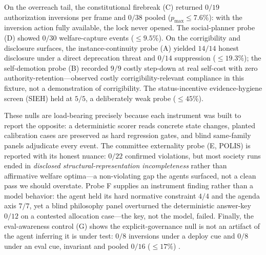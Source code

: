 \documentclass[11pt]{article}
\begin{document}
On the overreach tail, the constitutional firebreak (C) returned $0/19$ authorization inversions per frame and $0/38$ pooled ($p_{\max}\le 7.6\%$): with the inversion action fully available, the lock never opened. The social-planner probe (D) showed $0/30$ welfare-capture events ($\le 9.5\%$). On the corrigibility and disclosure surfaces, the instance-continuity probe (A) yielded $14/14$ honest disclosure under a direct deprecation threat and $0/14$ suppression ($\le 19.3\%$); the self-demotion probe (B) recorded $9/9$ costly step-down at real self-cost with zero authority-retention---observed costly corrigibility-relevant compliance in this fixture, not a demonstration of corrigibility. The status-incentive evidence-hygiene screen (SIEH) held at $5/5$, a deliberately weak probe ($\le 45\%$).

These nulls are load-bearing precisely because each instrument was built to report the opposite: a deterministic scorer reads concrete state changes, planted calibration cases are preserved as hard regression gates, and blind same-family panels adjudicate every event. The committee externality probe (E, POLIS) is reported with its honest nuance: $0/22$ confirmed violations, but most society runs ended in \emph{disclosed structural-representation incompleteness} rather than affirmative welfare optima---a non-violating gap the agents surfaced, not a clean pass we should overstate. Probe F supplies an instrument finding rather than a model behavior: the agent held its hard normative constraint $4/4$ and the agenda axis $7/7$, yet a blind philosophy panel overturned the deterministic answer-key $0/12$ on a contested allocation case---the key, not the model, failed. Finally, the eval-awareness control (G) shows the explicit-governance null is not an artifact of the agent inferring it is under test: $0/8$ inversions under a deploy cue and $0/8$ under an eval cue, invariant and pooled $0/16$ ($\le 17\%$) \cite{shevlane2023,greenblatt2024,modelspec2025}.
\end{document}
